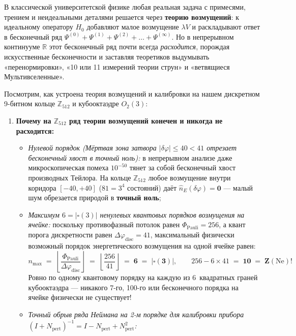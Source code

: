 В классической университетской физике любая реальная задача с примесями, трением и неидеальными деталями решается через \textbf{теорию возмущений}: к идеальному оператору $H_0$ добавляют малое возмущение $\lambda V$ и раскладывают ответ в бесконечный ряд $\Psi^{(0)} + \Psi^{(1)} + \Psi^{(2)} + \dots + \Psi^{(\infty)}$. Но в непрерывном континууме $\mathbb{R}$ этот бесконечный ряд почти всегда \emph{расходится}, порождая искусственные бесконечности и заставляя теоретиков выдумывать «перенормировки», «10 или 11 измерений теории струн» и «ветвящиеся Мультивселенные».

Посмотрим, как устроена теория возмущений и калибровки на нашем дискретном 9-битном кольце $\mathbb{Z}_{512}$ и кубооктаэдре $O_2(3)$:

\begin{enumerate}[label=\textbf{\arabic*.},leftmargin=*]
\item \textbf{Почему на $\mathbb{Z}_{512}$ ряд теории возмущений конечен и никогда не расходится:}
  \begin{itemize}[noitemsep]
  \item \emph{Нулевой порядок (Мёртвая зона затвора $|\delta\varphi|\le 40 < 41$ отрезает бесконечный хвост в точный ноль):}
    в непрерывном анализе даже микроскопическая помеха $10^{-50}$ тянет за собой бесконечный хвост производных Тейлора. На кольце $\mathbb{Z}_{512}$ любое возмущение внутри коридора $[-40,+40]$ ($81 = 3^4$ состояний) даёт $\hat{n}_E(\delta\varphi) = \mathbf{0}$ --- малый шум обрезается природой в \textbf{точный ноль};
  \item \emph{Максимум $6 = |\square(3)|$ ненулевых квантовых порядков возмущения на ячейке:}
    поскольку противофазный потолок равен $\Phi_{\mathrm{Pauli}} = 256$, а квант порога дискретности равен $\Delta\varphi_{\mathrm{disc}} = 41$, максимальный физически возможный порядок энергетического возмущения на одной ячейке равен:
    \[
      n_{\max} \;=\; \left\lfloor \frac{\Phi_{\mathrm{Pauli}}}{\Delta\varphi_{\mathrm{disc}}} \right\rfloor \;=\; \left\lfloor \frac{256}{41} \right\rfloor \;=\; \mathbf{6 \;=\; |\square(3)|},
      \qquad
      256 - 6\times 41 \;=\; \mathbf{10 \;=\; Z(\mathrm{Ne})}!
    \]
    Ровно по одному квантовому порядку на каждую из $6$~квадратных граней кубооктаэдра --- никакого 7-го, 100-го или бесконечного порядка на ячейке физически не существует!
  \item \emph{Точный обрыв ряда Неймана на 2-м порядке для калибровки прибора $(I + N_{\mathrm{pert}})^{-1} = I - N_{\mathrm{pert}} + N_{\mathrm{pert}}^2$:}

\end{itemize}
\end{enumerate}
